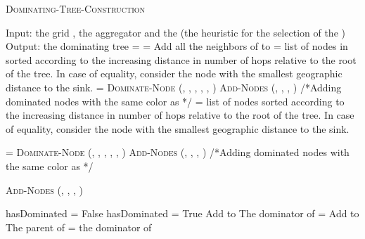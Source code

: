 \begin{algorithm}\caption{\textsc{Dominating-Tree-Construction}}\label{algo:domTree}
\begin{algorithmic}[1]
\begin{scriptsize}
\STATE Input: the grid , the aggregator  and the  (the heuristic for the selection of the )
\STATE Output: the dominating tree   
\STATE  = 
\STATE  =  \STATE Add all the neighbors of  to 
\STATE  = list of nodes in  sorted according to the increasing distance in number of hops relative to the root of the tree. In case of equality, consider the node with the smallest geographic distance to the sink.
\STATE 
{}
	\STATE  = \textsc{Dominate-Node} (, , ,  , , )
	\IF {()} 
	\STATE \textsc{Add-Nodes} (, , , ) /*Adding dominated nodes with the same color as */
	\ENDIF
\ENDFOR
\STATE  = list of nodes   sorted according to the increasing distance in number of hops relative to the root of the tree. In case of equality, consider the node with the smallest geographic distance to the sink.

\STATE  

	\STATE  = \textsc{Dominate-Node} (, , , , , )
	\IF {()} 
	\STATE \textsc{Add-Nodes} (, , , ) /*Adding dominated nodes with the same color as */
	\ENDIF
\ENDFOR
\end{scriptsize}
\end{algorithmic}
\end{algorithm}
\vspace{-11pt}
\begin{algorithm}
\caption{\textsc{Add-Nodes} (, , , )}\label{algo:addNode}
\begin{algorithmic}[1]
\begin{scriptsize}
	\IF {(  )}
	\STATE hasDominated = False	
		\STATE hasDominated = True		
		\STATE Add  to  		
		\STATE The dominator of  =  		
		\ENDIF	
	\ENDFOR
	\ENDIF	
		\STATE Add  to  \label{line:addT2}
		\STATE The parent of  = the dominator of 
	\ENDIF	
\ENDFOR
\end{scriptsize}\end{algorithmic}
\end{algorithm}




